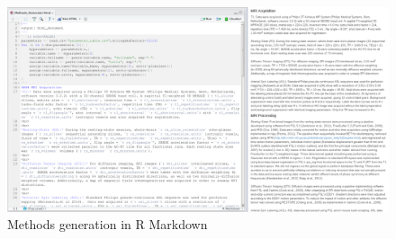 \begin{figure}
	\begin{center}
		\includegraphics[width=7in]{images/MethodsGenerator.png}
		\caption{Methods generation in R Markdown}
                \label{fig:methods}
	\end{center}
\end{figure}